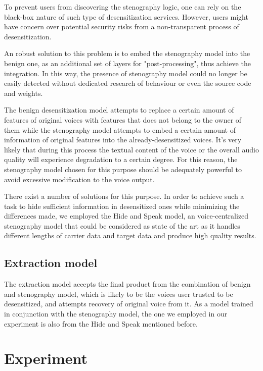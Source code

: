 \documentclass[journal]{IEEEtran} %
\begin{document}
\begin{CJK*}{UTF8}{gbsn}
To prevent users from discovering the stenography logic, one can rely on the black-box nature of such type of desensitization services. However, users might have concern over potential security risks from a non-transparent process of desensitization.

An robust solution to this problem is to embed the stenography model into the benign one, as an additional set of layers for "post-processing", thus achieve the integration. In this way, the presence of stenography model could no longer be easily detected without dedicated research of behaviour or even the source code and weights.

The benign desensitization model attempts to replace a certain amount of features of original voices with features that does not belong to the owner of them while the stenography model attempts to embed a certain amount of information of original features into the already-desensitized voices. It's very likely that during this process the textual content of the voice or the overall audio quality will experience degradation to a certain degree. For this reason, the stenography model chosen for this purpose should be adequately powerful to avoid excessive modification to the voice output.

There exist a number of solutions for this purpose\cite{a5}. In order to achieve such a task to hide sufficient information in desensitized ones while minimizing the differences made, we employed the Hide and Speak model\cite{a4}, an voice-centralized stenography model that could be considered as state of the art as it handles different lengths of carrier data and target data and produce high quality results.

\subsection{Extraction model}

The extraction model accepts the final product from the combination of benign and stenography model, which is likely to be the voices user trusted to be desensitized, and attempts recovery of original voice from it. As a model trained in conjunction with the stenography model, the one we employed in our experiment is also from the Hide and Speak mentioned before.

\section{Experiment}


\end{CJK*}
\end{document}
